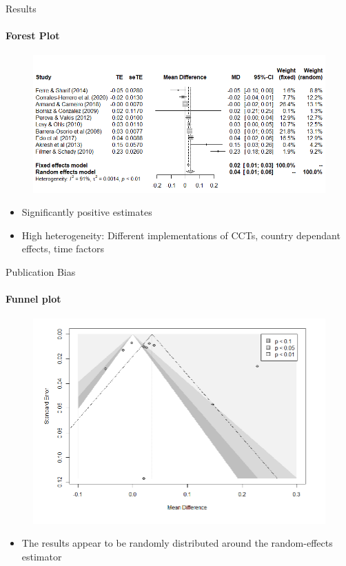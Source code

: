 \documentclass{beamer}
\begin{document}
\begin{frame}{Results}
\framesubtitle{Forest Plot}
\begin{center}
\begin{figure}
    \includegraphics[scale=0.48]{figures/forest_plot.png}
    \label{fig:forest}
\end{figure}
\end{center}
\begin{itemize}
    \item Significantly positive estimates
    \item High heterogeneity: Different implementations of CCTs, country dependant effects, time factors
\end{itemize}
\end{frame}



\begin{frame}{Publication Bias}
\framesubtitle{Funnel plot}
    \begin{figure}
        \centering
        \includegraphics[scale=0.4]{figures/funnel.png}
        \label{fig:funnel}
    \end{figure}
\begin{itemize}
    \item The results appear to be randomly distributed around the random-effects estimator
\end{itemize}
\end{frame}
\end{document}
